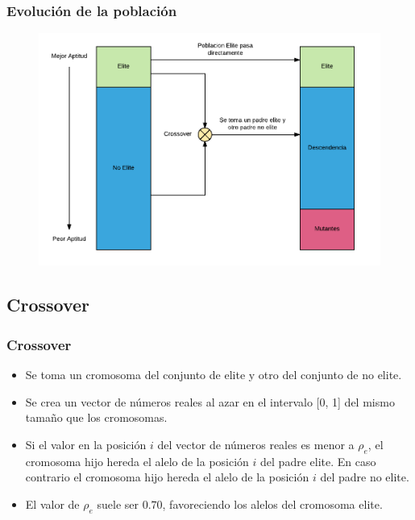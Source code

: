 \documentclass{beamer}
\begin{document}
\begin{frame}
\frametitle{Evolución de la población}

\begin{figure}[h]
	\centering
	\includegraphics[width=12cm]{EvolucionPoblacion}
	\label{fig:EvolucionPoblacion}
\end{figure}

\end{frame}


\subsection{Crossover}

\begin{frame}
\frametitle{Crossover}

\begin{itemize}
    \item Se toma un cromosoma del conjunto de elite y otro del conjunto de no elite.
    \pause
    \item Se crea un vector de números reales al azar en el intervalo [0, 1] del mismo tamaño que los cromosomas.
    \pause
    \item Si el valor en la posición $i$ del vector de números reales es menor a $\rho_e$, el cromosoma hijo hereda el alelo de la posición $i$ del padre elite. En caso contrario el cromosoma hijo hereda el alelo de la posición $i$ del padre no elite.
    \pause
    \item El valor de $\rho_e$ suele ser $0.70$, favoreciendo los alelos del cromosoma elite.
\end{itemize}

\end{frame}
\end{document}
